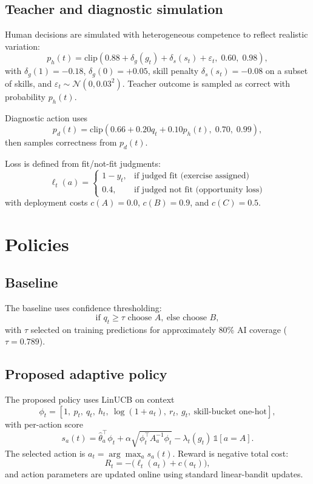 \documentclass{article}
\begin{document}
\subsection{Teacher and diagnostic simulation}
Human decisions are simulated with heterogeneous competence to reflect realistic variation:
\[
p_h(t)=\mathrm{clip}\!\left(0.88 + \delta_g(g_t) + \delta_s(s_t) + \varepsilon_t,\;0.60,\;0.98\right),
\]
with \(\delta_g(1)=-0.18\), \(\delta_g(0)=+0.05\), skill penalty \(\delta_s(s_t)=-0.08\) on a subset of skills, and \(\varepsilon_t\sim\mathcal{N}(0,0.03^2)\).
Teacher outcome is sampled as correct with probability \(p_h(t)\).

Diagnostic action uses
\[
p_d(t)=\mathrm{clip}\!\left(0.66 + 0.20q_t + 0.10p_h(t),\;0.70,\;0.99\right),
\]
then samples correctness from \(p_d(t)\).

Loss is defined from fit/not-fit judgments:
\[
\ell_t(a)=
\begin{cases}
1-y_t, & \text{if judged fit (exercise assigned)}\\
0.4, & \text{if judged not fit (opportunity loss)}
\end{cases}
\]
with deployment costs \(c(A)=0.0\), \(c(B)=0.9\), and \(c(C)=0.5\).

\section{Policies}
\subsection{Baseline}
The baseline uses confidence thresholding:
\[
\text{if } q_t\ge \tau \text{ choose }A,\ \text{else choose }B,
\]
with \(\tau\) selected on training predictions for approximately 80\% AI coverage (\(\tau=0.789\)).

\subsection{Proposed adaptive policy}
The proposed policy uses LinUCB \citep{lattimore_bandit} on context
\[
\phi_t=[1,\ p_t,\ q_t,\ h_t,\ \log(1+a_t),\ r_t,\ g_t,\ \text{skill-bucket one-hot}],
\]
with per-action score
\[
s_a(t)=\hat\theta_a^\top \phi_t + \alpha\sqrt{\phi_t^\top A_a^{-1}\phi_t}
- \lambda_t(g_t)\,\mathds{1}[a=A].
\]
The selected action is \(a_t=\arg\max_a s_a(t)\). Reward is negative total cost:
\[
R_t = -\big(\ell_t(a_t)+c(a_t)\big),
\]
and action parameters are updated online using standard linear-bandit updates.
\end{document}
